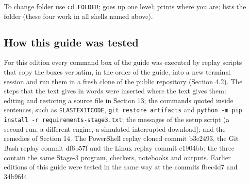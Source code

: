 \documentclass[11pt]{article}
\begin{document}
To change folder use \texttt{cd FOLDE\allowbreak{}R}; \texttt{} goes up one level; \texttt{} prints where you are; \texttt{} lists the folder (these four work in all shells named above).

\subsection{How this guide was tested}

For this edition every command box of the guide was executed by replay scripts that copy the boxes verbatim, in the order of the guide, into a new terminal session and run them in a fresh clone of the public repository (Section 4.2). The steps that the text gives in words were inserted where the text gives them: editing and restoring a source file in Section 13; the commands quoted inside sentences, such as \texttt{\$LASTEXI\allowbreak{}TCODE}, \texttt{git rest\allowbreak{}ore arti\allowbreak{}facts} and \texttt{python -\allowbreak{}m pip in\allowbreak{}stall -r\allowbreak{} require\allowbreak{}ments-st\allowbreak{}age3.txt}; the messages of the setup script (a second run, a different engine, a simulated interrupted download); and the remedies of Section 14. The PowerShell replay cloned commit b3e2493, the Git Bash replay commit df6b57f and the Linux replay commit e1904bb; the three contain the same Stage-3 program, checkers, notebooks and outputs. Earlier editions of this guide were tested in the same way at the commits fbec4d7 and 34b9fd4.
\end{document}
